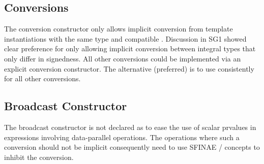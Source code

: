 \subsection{Conversions}
The \datapar conversion constructor only allows implicit conversion from \datapar template instantiations with the same  type and compatible .
Discussion in SG1 showed clear preference for only allowing implicit conversion between integral types that only differ in signedness.
All other conversions could be implemented via an explicit conversion constructor.
The alternative (preferred) is to use \simdcast consistently for all other conversions.

\subsection{Broadcast Constructor}
The broadcast constructor is not declared as  to ease the use of scalar prvalues in expressions involving data-parallel operations.
The operations where such a conversion should not be implicit consequently need to use SFINAE / concepts to inhibit the conversion.
